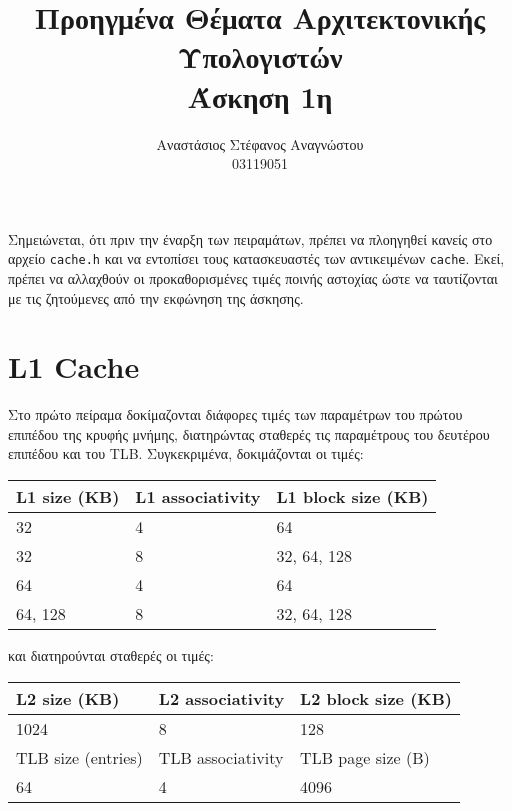 \documentclass{article}
\title{Προηγμένα Θέματα Αρχιτεκτονικής Υπολογιστών\\
\large Άσκηση 1η}
\author{Αναστάσιος Στέφανος Αναγνώστου \\
\large 03119051}
\newcommand{\eng}[1]{\foreignlanguage{english}{#1}}
\begin{document}
\maketitle

\clearpage
\tableofcontents
\clearpage

Σημειώνεται, ότι πριν την έναρξη των πειραμάτων, πρέπει να πλοηγηθεί κανείς στο αρχείο \texttt{\eng{cache.h}} και να εντοπίσει τους κατασκευαστές των αντικειμένων \texttt{\eng{cache}}. Εκεί, πρέπει να αλλαχθούν οι προκαθορισμένες τιμές ποινής αστοχίας ώστε να ταυτίζονται με τις ζητούμενες από την εκφώνηση της άσκησης.

\section{\eng{L1 Cache}}

Στο πρώτο πείραμα δοκίμαζονται διάφορες τιμές των παραμέτρων του πρώτου επιπέδου της κρυφής μνήμης, διατηρώντας σταθερές τις παραμέτρους του δευτέρου επιπέδου και του \eng{TLB}. Συγκεκριμένα, δοκιμάζονται οι τιμές:

\begin{table}[h]
    \centering
    \begin{tabular}{|p{3cm}|p{3cm}|p{3cm}|}
        \hline
        L1 size (KB) & L1 associativity & L1 block size (KB)\\
        \hline
        32 & 4 & 64\\
        \hline    
        32 & 8 & 32, 64, 128\\
        \hline
        64 & 4 & 64\\
        \hline
        64, 128 & 8 & 32, 64, 128\\
        \hline
    \end{tabular}
\end{table}

και διατηρούνται σταθερές οι τιμές:

\begin{table}[h]
    \centering
    \begin{tabular}{|p{3cm}|p{3cm}|p{3cm}|}
        \hline
        L2 size (KB) & L2 associativity & L2 block size (KB)\\
        \hline
        \hline
        1024 & 8 & 128\\
        \hline
        TLB size (entries) & TLB associativity & TLB page size (B)\\
        \hline    
        \hline
        64 & 4 & 4096\\
        \hline
    \end{tabular}
\end{table}
\end{document}
